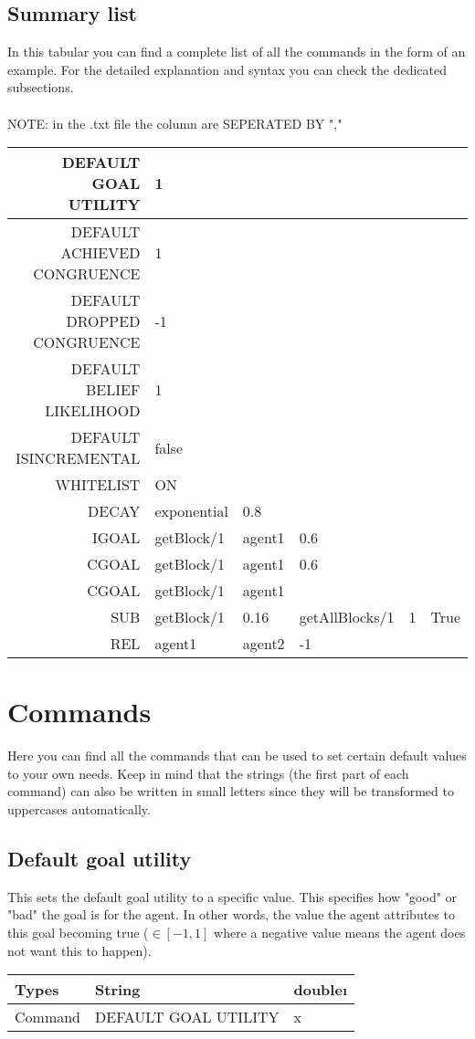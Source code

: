 \documentclass{scrartcl}
\begin{document}
\subsection{Summary list}
In this tabular you can find a complete list of all the commands in the form of an example. For the detailed explanation and syntax you can check the dedicated subsections.\\
\\
NOTE: in the .txt file the column are SEPERATED BY ","\\
\begin{tabular}{|r|l|l|l|l|l|}
	\hline  DEFAULT GOAL UTILITY & 1 &  &  &  &\\ 
	\hline  DEFAULT ACHIEVED CONGRUENCE & 1 &  &  &  &\\ 
	\hline  DEFAULT DROPPED CONGRUENCE & -1 &  &  &  &\\ 
	\hline  DEFAULT BELIEF LIKELIHOOD& 1 &  &  &  &\\ 
	\hline  DEFAULT ISINCREMENTAL & false &  &  &  &\\ 
	\hline  WHITELIST & ON &  &  &  &\\ 
	\hline  DECAY & exponential & 0.8 & & & \\
	\hline  IGOAL &  getBlock/1 &  agent1 &  0.6&  &\\ 
	\hline  CGOAL &  getBlock/1 &  agent1 &  0.6&  &\\ 
	\hline  CGOAL &  getBlock/1 &  agent1 &  &  &\\
	\hline  SUB& getBlock/1 & 0.16 & getAllBlocks/1 & 1 & True\\ 
	\hline  REL &  agent1&  agent2 & -1 &  &\\
	\hline  
\end{tabular}

\pagebreak
\section{Commands}
Here you can find all the commands that can be used to set certain default values to your own needs. Keep in mind that the strings (the first part of each command) can also be written in small letters since they will be transformed to uppercases automatically. 

\subsection{Default goal utility}

This sets the default goal utility to a specific value. This specifies how "good" or "bad" the goal is for the agent. In other words, the value the agent attributes to this goal
becoming true ($  \in[-1, 1]$ where a negative value means the agent does not want this to happen).\\
\begin{tabular}{|l|l|l|}
	\hline  Types & String & double\i  \\ 
	\hline  Command & DEFAULT GOAL UTILITY & x  \\ 
	\hline 
\end{tabular}
\\
\end{document}
